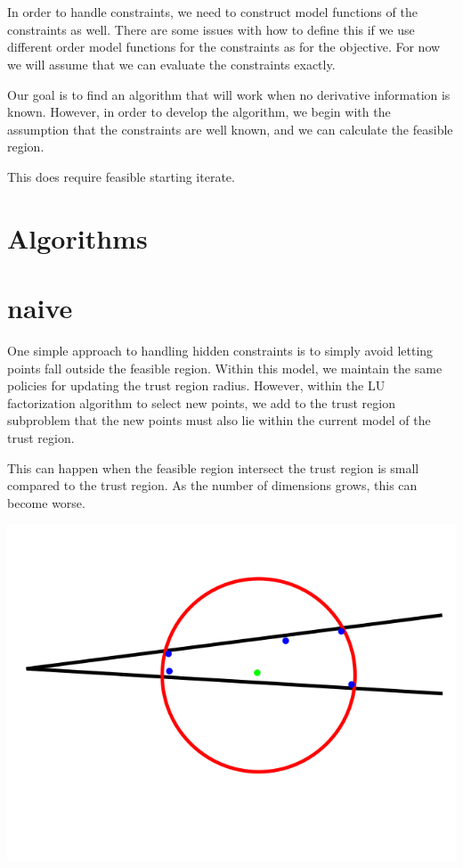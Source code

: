 \documentclass{article}
\begin{document}
\section{}
In order to handle constraints, we need to construct model functions of the constraints as well.
There are some issues with how to define this if we use different order model functions for the constraints as for the objective.
For now we will assume that we can evaluate the constraints exactly.

Our goal is to find an algorithm that will work when no derivative information is known.
However, in order to develop the algorithm, we begin with the assumption that the constraints are well known, and we can calculate the feasible region.

This does require feasible starting iterate.


\section{Algorithms}


\section{naive}
One simple approach to handling hidden constraints is to simply avoid letting points fall outside the feasible region.
Within this model, we maintain the same policies for updating the trust region radius.
However, within the LU factorization algorithm to select new points, we add to the trust region subproblem that the new points must also lie within the current model of the trust region.

This can happen when the feasible region intersect the trust region is small compared to the trust region.
As the number of dimensions grows, this can become worse.

\includegraphics[scale=0.2]{bad_lambda.png}
\end{document}
